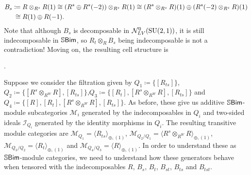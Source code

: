 \begin{example}
\begin{align*}
\begin{split}
B_s &\coloneqq R \otimes_{R^s} R(1) \cong (R^s \oplus R^s(-2)) \otimes_{R^s} R(1) \cong (R^s \otimes_{R^s} R)(1) \oplus (R^s(-2) \otimes_{R^s} R)(1)\\
&\hphantom{\coloneqq}\nhphantom{$\cong$}\cong R(1) \oplus R(-1).
\end{split}
\end{align*}
\noindent Note that although $B_s$ is decomposable in $\mathcal{N}_{LV}^0(\textup{SU}(2, 1))$, it is still indecomposable in $\mathbb{S}\textup{\textsf{Bim}}$, so $R_t \otimes_R B_s$ being indecomposable is not a contradiction! Moving on, the resulting cell structure is
\begin{center}
.
\end{center}
\noindent Suppose we consider the filtration given by $Q_1 \coloneqq \{[R_{ts}]\}$, $Q_2 \coloneqq \{[R^s \otimes_{R^W} R], [R_{ts}]\}$,\linebreak $Q_3 \coloneqq \{[R_t], [R^s \otimes_{R^W} R], [R_{ts}]\}$ and $Q_4 \coloneqq \{[R], [R_t], [R^s \otimes_{R^W} R], [R_{ts}]\}$. As before, these give us additive $\mathbb{S}\textup{\textsf{Bim}}$-module subcategories $\mathcal{M}_i$ generated by the indecomposables in $Q_i$ and two-sided ideals $\mathcal{I}_{Q_i}$ generated by the identity morphisms in $Q_i$. The resulting transitive module categories are $\mathcal{M}_{Q_1} = \langle R_{ts} \rangle_{\oplus,(1)}$, $\mathcal{M}_{Q_2/Q_1} = \langle R^s \otimes_{R^W} R \rangle_{\oplus,(1)}$, $\mathcal{M}_{Q_3/Q_2} = \langle R_t \rangle_{\oplus,(1)}$ and $\mathcal{M}_{Q_4/Q_3} = \langle R \rangle_{\oplus,(1)}$. In order to understand these as $\mathbb{S}\textup{\textsf{Bim}}$-module categories, we need to understand how these generators behave when tensored with the indecomposables $R$, $B_s$, $B_t$, $B_{st}$, $B_{ts}$ and $B_{tst}$.\\ %
\end{example}
\newpage

\renewcommand\thesection{R}
\begingroup
\setlength{\emergencystretch}{.5em}
\printbibliography[heading=none]
\endgroup
\newpage

